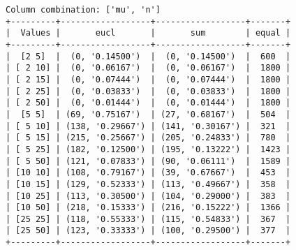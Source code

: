 \documentclass{article}
\begin{document}
\begin{verbatim}
Column combination: ['mu', 'n']
+---------+------------------+------------------+-------+
|  Values |       eucl       |       sum        | equal |
+---------+------------------+------------------+-------+
|  [2 5]  |  (0, '0.14500')  |  (0, '0.14500')  |  600  |
| [ 2 10] |  (0, '0.06167')  |  (0, '0.06167')  |  1800 |
| [ 2 15] |  (0, '0.07444')  |  (0, '0.07444')  |  1800 |
| [ 2 25] |  (0, '0.03833')  |  (0, '0.03833')  |  1800 |
| [ 2 50] |  (0, '0.01444')  |  (0, '0.01444')  |  1800 |
|  [5 5]  | (69, '0.75167')  | (27, '0.68167')  |  504  |
| [ 5 10] | (138, '0.29667') | (141, '0.30167') |  321  |
| [ 5 15] | (215, '0.25667') | (205, '0.24833') |  780  |
| [ 5 25] | (182, '0.12500') | (195, '0.13222') |  1423 |
| [ 5 50] | (121, '0.07833') | (90, '0.06111')  |  1589 |
| [10 10] | (108, '0.79167') | (39, '0.67667')  |  453  |
| [10 15] | (129, '0.52333') | (113, '0.49667') |  358  |
| [10 25] | (113, '0.30500') | (104, '0.29000') |  383  |
| [10 50] | (218, '0.15333') | (216, '0.15222') |  1366 |
| [25 25] | (118, '0.55333') | (115, '0.54833') |  367  |
| [25 50] | (123, '0.33333') | (100, '0.29500') |  377  |
+---------+------------------+------------------+-------+
\end{verbatim}
\end{document}
